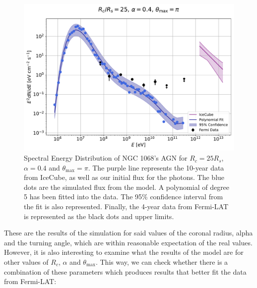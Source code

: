 \begin{figure}[H]
    \includegraphics[width=\textwidth]{Figures/example_simulation_plot.pdf}
    \centering
    \caption{Spectral Energy Distribution of NGC 1068's AGN for $R_c=25R_s$, $\alpha=0.4$ and $\theta_{\max} = \pi$. The purple line represents the 10-year data from IceCube, as well as our initial flux for the photons. The blue dots are the simulated flux from the model. A polynomial of degree 5 has been fitted into the data. The 95\% confidence interval from the fit is also represented. Finally, the 4-year data from Fermi-LAT is represented as the black dots and upper limits.}
    \label{fig:example_simulation_plot}
\end{figure}

These are the results of the simulation for said values of the coronal radius, alpha and the turning angle, which are within reasonable expectation of the real values. However, it is also interesting to examine what the results of the model are for other values of $R_c$, $\alpha$ and $\theta_{\max}$. This way, we can check whether there is a combination of these parameters which produces results that better fit the data from Fermi-LAT:

